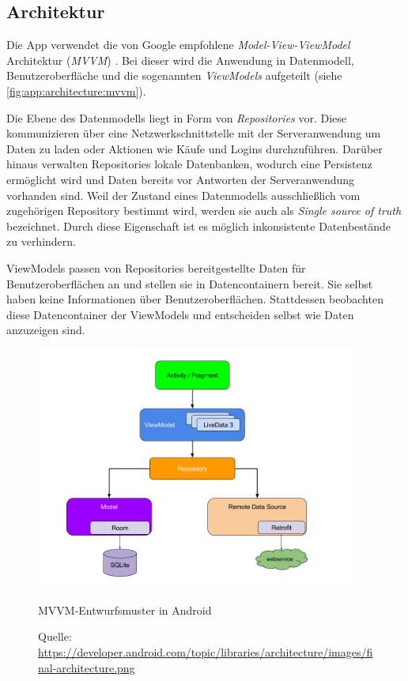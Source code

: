\documentclass[a4paper, 11pt]{article}
\begin{document}
\subsection{Architektur}
\label{subsec:app:architecture}

Die App verwendet die von Google empfohlene \textit{Model-View-ViewModel} Architektur (\textit{MVVM}) \autocite{androidarchitecture}.
Bei dieser wird die Anwendung in Datenmodell, Benutzeroberfläche und die sogenannten \textit{ViewModels} aufgeteilt (siehe \autoref{fig:app:architecture:mvvm}).

Die Ebene des Datenmodells liegt in Form von \textit{Repositories} vor.
Diese kommunizieren über eine Netzwerkschnittstelle mit der Serveranwendung um Daten zu laden oder Aktionen wie Käufe und Logins durchzuführen.
Darüber hinaus verwalten Repositories lokale Datenbanken, wodurch eine Persistenz ermöglicht wird und Daten bereits vor Antworten der Serveranwendung vorhanden sind.
Weil der Zustand eines Datenmodells ausschließlich vom zugehörigen Repository bestimmt wird, werden sie auch als \textit{Single source of truth} bezeichnet.
Durch diese Eigenschaft ist es möglich inkonsistente Datenbestände zu verhindern.

ViewModels passen von Repositories bereitgestellte Daten für Benutzeroberflächen an und stellen sie in Datencontainern bereit.
Sie selbst haben keine Informationen über Benutzeroberflächen.
Stattdessen beobachten diese Datencontainer der ViewModels und entscheiden selbst wie Daten anzuzeigen sind.

\begin{figure}[H]
	\centering
	\includegraphics[height=8cm,keepaspectratio]{./images/android-architecture.png}
	\caption{MVVM-Entwurfsmuster in Android}
	\caption*{\small Quelle: \url{https://developer.android.com/topic/libraries/architecture/images/final-architecture.png}}
	\label{fig:app:architecture:mvvm}
\end{figure}
\end{document}
